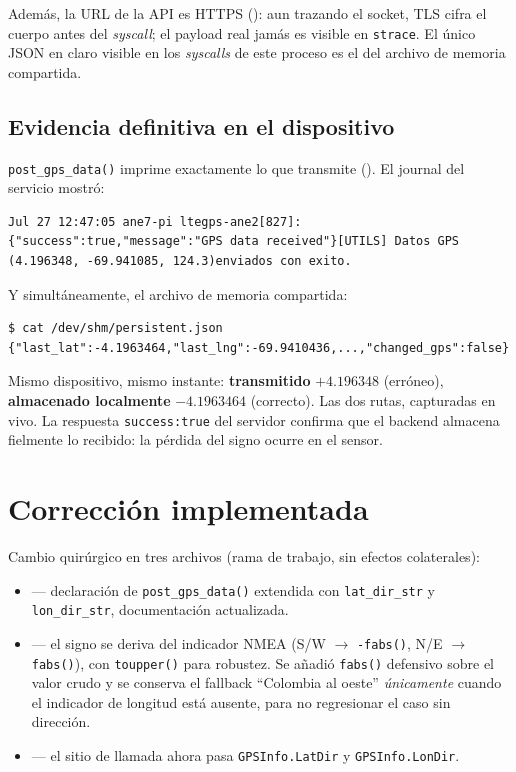 \documentclass[11pt,a4paper]{report}
\begin{document}
Además, la URL de la API es HTTPS (): aun trazando el
socket, TLS cifra el cuerpo antes del \emph{syscall}; el payload real jamás es visible en
\texttt{strace}. El único JSON en claro visible en los \emph{syscalls} de este proceso es
el del archivo de memoria compartida.

\section{Evidencia definitiva en el dispositivo}

\lstinline|post_gps_data()| imprime exactamente lo que transmite ().
El journal del servicio mostró:

\begin{lstlisting}
Jul 27 12:47:05 ane7-pi ltegps-ane2[827]: {"success":true,"message":"GPS data received"}[UTILS] Datos GPS (4.196348, -69.941085, 124.3)enviados con exito.
\end{lstlisting}

Y simultáneamente, el archivo de memoria compartida:

\begin{lstlisting}
$ cat /dev/shm/persistent.json
{"last_lat":-4.1963464,"last_lng":-69.9410436,...,"changed_gps":false}
\end{lstlisting}

Mismo dispositivo, mismo instante: \textbf{transmitido} $+4.196348$ (erróneo),
\textbf{almacenado localmente} $-4.1963464$ (correcto). Las dos rutas, capturadas en vivo.
La respuesta \texttt{success:true} del servidor confirma que el backend almacena
fielmente lo recibido: la pérdida del signo ocurre en el sensor.

\chapter{Corrección implementada}

Cambio quirúrgico en tres archivos (rama de trabajo, sin efectos colaterales):

\begin{itemize}
\item {} --- declaración de \lstinline|post_gps_data()| extendida
con \texttt{lat\_dir\_str} y \texttt{lon\_dir\_str}, documentación actualizada.
\item {} --- el signo se deriva del indicador NMEA
(S/W $\rightarrow$ \texttt{-fabs()}, N/E $\rightarrow$ \texttt{fabs()}), con
\lstinline|toupper()| para robustez. Se añadió \texttt{fabs()} defensivo sobre el valor
crudo y se conserva el fallback ``Colombia al oeste'' \emph{únicamente} cuando el
indicador de longitud está ausente, para no regresionar el caso sin dirección.
\item {} --- el sitio de llamada ahora pasa
\lstinline|GPSInfo.LatDir| y \lstinline|GPSInfo.LonDir|.
\end{itemize}
\end{document}
